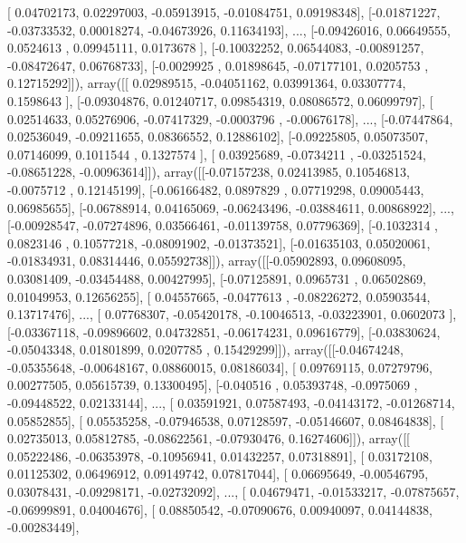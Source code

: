 \documentclass{article}
\begin{document}
       [ 0.04702173,  0.02297003, -0.05913915, -0.01084751,  0.09198348],
       [-0.01871227, -0.03733532,  0.00018274, -0.04673926,  0.11634193],
       ..., 
       [-0.09426016,  0.06649555,  0.0524613 ,  0.09945111,  0.0173678 ],
       [-0.10032252,  0.06544083, -0.00891257, -0.08472647,  0.06768733],
       [-0.0029925 ,  0.01898645, -0.07177101,  0.0205753 ,  0.12715292]]), array([[ 0.02989515, -0.04051162,  0.03991364,  0.03307774,  0.1598643 ],
       [-0.09304876,  0.01240717,  0.09854319,  0.08086572,  0.06099797],
       [ 0.02514633,  0.05276906, -0.07417329, -0.0003796 , -0.00676178],
       ..., 
       [-0.07447864,  0.02536049, -0.09211655,  0.08366552,  0.12886102],
       [-0.09225805,  0.05073507,  0.07146099,  0.1011544 ,  0.1327574 ],
       [ 0.03925689, -0.0734211 , -0.03251524, -0.08651228, -0.00963614]]), array([[-0.07157238,  0.02413985,  0.10546813, -0.0075712 ,  0.12145199],
       [-0.06166482,  0.0897829 ,  0.07719298,  0.09005443,  0.06985655],
       [-0.06788914,  0.04165069, -0.06243496, -0.03884611,  0.00868922],
       ..., 
       [-0.00928547, -0.07274896,  0.03566461, -0.01139758,  0.07796369],
       [-0.1032314 ,  0.0823146 ,  0.10577218, -0.08091902, -0.01373521],
       [-0.01635103,  0.05020061, -0.01834931,  0.08314446,  0.05592738]]), array([[-0.05902893,  0.09608095,  0.03081409, -0.03454488,  0.00427995],
       [-0.07125891,  0.0965731 ,  0.06502869,  0.01049953,  0.12656255],
       [ 0.04557665, -0.0477613 , -0.08226272,  0.05903544,  0.13717476],
       ..., 
       [ 0.07768307, -0.05420178, -0.10046513, -0.03223901,  0.0602073 ],
       [-0.03367118, -0.09896602,  0.04732851, -0.06174231,  0.09616779],
       [-0.03830624, -0.05043348,  0.01801899,  0.0207785 ,  0.15429299]]), array([[-0.04674248, -0.05355648, -0.00648167,  0.08860015,  0.08186034],
       [ 0.09769115,  0.07279796,  0.00277505,  0.05615739,  0.13300495],
       [-0.040516  ,  0.05393748, -0.0975069 , -0.09448522,  0.02133144],
       ..., 
       [ 0.03591921,  0.07587493, -0.04143172, -0.01268714,  0.05852855],
       [ 0.05535258, -0.07946538,  0.07128597, -0.05146607,  0.08464838],
       [ 0.02735013,  0.05812785, -0.08622561, -0.07930476,  0.16274606]]), array([[ 0.05222486, -0.06353978, -0.10956941,  0.01432257,  0.07318891],
       [ 0.03172108,  0.01125302,  0.06496912,  0.09149742,  0.07817044],
       [ 0.06695649, -0.00546795,  0.03078431, -0.09298171, -0.02732092],
       ..., 
       [ 0.04679471, -0.01533217, -0.07875657, -0.06999891,  0.04004676],
       [ 0.08850542, -0.07090676,  0.00940097,  0.04144838, -0.00283449],
\end{document}
